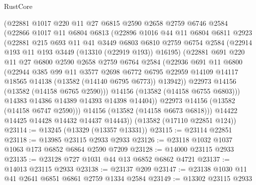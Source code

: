 \begin{lexlean}{RustCore}
\begin{coremodule}
          (@22881
            @1017
            @220
            @11
            @27
            @6815
            @2590
            @2658
            @2759
            @6746
            @2584
            (@22866
              @1017
              @11
              @6804
              @6813
              (@22896
                @1016
                @44
                @11
                @6804
                @6811
                @2923
                (@22881
                  @215
                  @693
                  @11
                  @41
                  @3449
                  @6803
                  @6810
                  @2759
                  @6754
                  @2584
                  (@22914 @193 @11 @193 @3449 (@13310 (@22919 @193)) @16195)
                  (@22881
                    @691
                    @220
                    @11
                    @27
                    @6800
                    @2590
                    @2658
                    @2759
                    @6764
                    @2584
                    (@22936
                      @691
                      @11
                      @6800
                      (@22944
                        @385
                        @99
                        @11
                        @3577
                        @2698
                        @6772
                        @6795
                        @22959
                        @14109
                        @14117
                        @18565
                        @14138
                        (@13582 (@14140 @6795 @6773))
                        @13942))
                    @22973
                    @14156
                    (@13582 (@14158 @6765 @2590)))
                  @14156
                  (@13582 (@14158 @6755 @6803)))
                @14383
                @14386
                @14389
                @14393
                @14398
                @14404))
            @22973
            @14156
            (@13582 (@14158 @6747 @2590)))
          @14156
          (@13582 (@14158 @6673 @6818)))
        @14422
        @14425
        @14428
        @14432
        @14437
        @14443))
    (@13582 (@17110 @22851 @124))
@23114 := @13245 (@13329 (@13357 @13331))
@23115 := @23114 @22851
@23118 := @13985 @23115 @2933 @2933
@23126 := @23118 @1032 @1037 @1063 @173 @6852 @6864 @2590 @7209
@23128 := @14000 @23115 @2933
@23135 := @23128 @727 @1031 @44 @13 @6852 @6862 @4721
@23137 := @14013 @23115 @2933
@23138 := @23137 @209
@23147 := @23138 @1030 @11 @41 @2641 @6851 @6861 @2759 @1334 @2584
@23149 := @13302 @23115 @2933

\end{coremodule}
\end{lexlean}

